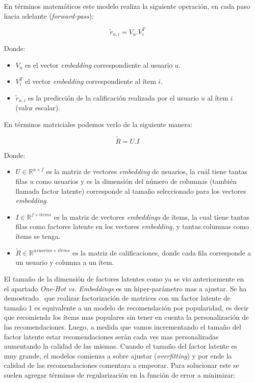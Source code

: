 \documentclass[11pt,a4paper,twoside]{thesis}
\begin{document}
\clearpage

En términos matemáticos este modelo realiza la siguiente operación, en cada
paso hacia adelante (\textit{forward-pass}):

\begin{equation}
	\tilde{r}_{u, i} = V_u . V_i^{T}
\end{equation}
\begin{description}
	\item[Donde:]
\end{description}
\begin{itemize}
	\item $V_u$ es el vector \textit{embedding} correspondiente al usuario $u$.
	\item $V_i^{T}$ el vector \textit{embedding} correspondiente al ítem $i$.
	\item $ \tilde{r}_{u, i}$ es la predicción de la calificación realizada por el usuario $u$ al ítem $i$ (valor escalar).
\end{itemize}

En términos matriciales podemos verlo de la siguiente manera:

\begin{equation}
	\tilde{R} = U.I
\end{equation}
\begin{description}
	\item[Donde:]
\end{description}
\begin{itemize}
	\item $U\in\mathbb{R}^{u \times f}$ es la matriz de vectores \textit{embedding} de usuarios, la cuál tiene tantas filas $u$ como usuarios y es la dimensión del número de columnas (también llamada factor latente) corresponde al tamaño seleccionado para los vectores \textit{embedding}.
	\item $I\in\mathbb{R}^{f\times items}$ es la matriz de vectores \textit{embeddings} de ítems, la cual tiene tantas filas como factores latente en los vectores \textit{embedding}, y tantas columnas como ítems se tenga.
	\item $\tilde{R}\in\mathbb{R}^{usuarios \times items}$ es la matriz de calificaciones, donde cada fila corresponde a un usuario y columna a un ítem.
\end{itemize}

El tamaño de la dimensión de factores latentes como ya se vio anteriormente en
el apartado \textit{One-Hot vs. Embeddings} es un hiper-parámetro mas a
ajustar. Se ha demostrado~\cite{embeddingsizedem} que realizar factorización de
matrices con un factor latente de tamaño 1 es equivalente a un modelo de
recomendación por popularidad, es decir que recomienda los ítems mas populares
sin tener en cuenta la personalización de las recomendaciones. Luego, a medida
que vamos incrementando el tamaño del factor latente estar recomendaciones
serán cada ves mas personalizadas aumentando la calidad de las mismas. Cuando
el tamaño del factor latente es muy grande, el modelos comienza a sobre ajustar
(\textit{overfitting}) y por ende la calidad de las recomendaciones comentara a
empeorar. Para solucionar este se suelen agregar términos de regularización en
la función de error a minimizar:
\end{document}
